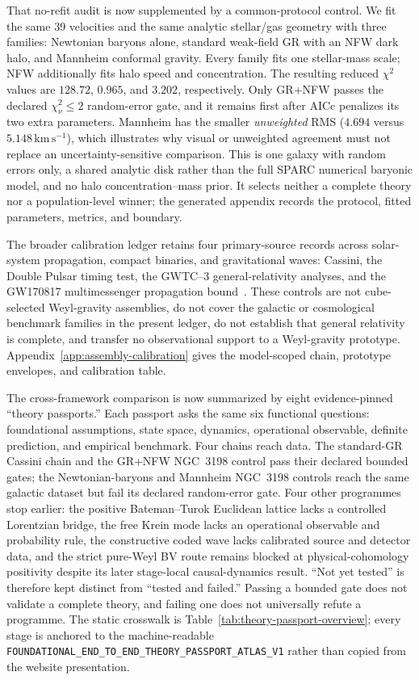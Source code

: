 \documentclass[11pt]{article}
\theoremstyle{definition}
\theoremstyle{remark}
\newcommand{\cert}[1]{\nolinkurl{#1}}
\begin{document}
That no-refit audit is now supplemented by a common-protocol control.  We fit
the same 39 velocities and the same analytic stellar/gas geometry with three
families: Newtonian baryons alone, standard weak-field GR with an NFW dark
halo, and Mannheim conformal gravity.  Every family fits one stellar-mass
scale; NFW additionally fits halo speed and concentration.  The resulting
reduced $\chi^2$ values are $128.72$, $0.965$, and $3.202$, respectively.
Only GR+NFW passes the declared $\chi^2_\nu\leq2$ random-error gate, and it
remains first after AICc penalizes its two extra parameters.  Mannheim has the
smaller \emph{unweighted} RMS ($4.694$ versus $5.148\,\mathrm{km\,s^{-1}}$),
which illustrates why visual or unweighted agreement must not replace an
uncertainty-sensitive comparison.  This is one galaxy with random errors
only, a shared analytic disk rather than the full SPARC numerical baryonic
model, and no halo concentration--mass prior.  It selects neither a complete
theory nor a population-level winner; the generated appendix records the
protocol, fitted parameters, metrics, and boundary.

The broader calibration ledger retains four primary-source records across
solar-system propagation, compact binaries, and gravitational waves: Cassini,
the Double Pulsar timing test, the GWTC--3 general-relativity analyses, and the
GW170817 multimessenger propagation bound~\cite{Bertotti2003,Kramer2021,LVKGWTC32021,AbbottGW1708172017}.
These controls are not cube-selected Weyl-gravity assemblies, do not cover the
galactic or cosmological benchmark families in the present ledger, do not
establish that general relativity is complete, and transfer no observational
support to a Weyl-gravity prototype.  Appendix~\ref{app:assembly-calibration}
gives the model-scoped chain, prototype envelopes, and calibration table.

The cross-framework comparison is now summarized by eight evidence-pinned
``theory passports.''  Each passport asks the same six functional questions:
foundational assumptions, state space, dynamics, operational observable,
definite prediction, and empirical benchmark.  Four chains reach data.  The
standard-GR Cassini chain and the GR+NFW NGC~3198 control pass their declared
bounded gates; the Newtonian-baryons and Mannheim NGC~3198 controls reach the
same galactic dataset but fail its declared random-error gate.  Four other
programmes stop earlier: the positive Bateman--Turok Euclidean lattice lacks a
controlled Lorentzian bridge, the free Krein mode lacks an operational
observable and probability rule, the constructive coded wave lacks calibrated
source and detector data, and the strict pure-Weyl BV route remains blocked at
physical-cohomology positivity despite its later stage-local causal-dynamics
result.  ``Not yet tested'' is therefore kept distinct from ``tested and
failed.''  Passing a bounded gate does not validate a complete theory, and
failing one does not universally refute a programme.  The static crosswalk is
Table~\ref{tab:theory-passport-overview}; every stage is anchored to the
machine-readable
\cert{FOUNDATIONAL_END_TO_END_THEORY_PASSPORT_ATLAS_V1} rather than copied from
the website presentation.
\end{document}
